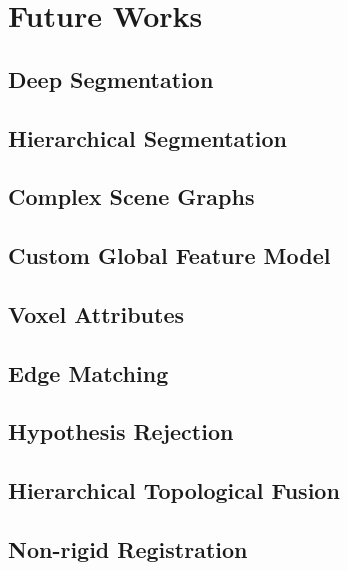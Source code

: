 \section{Future Works}

\subsection{Deep Segmentation}
\subsection{Hierarchical Segmentation}
\subsection{Complex Scene Graphs}

\subsection{Custom Global Feature Model}
\subsection{Voxel Attributes}
\subsection{Edge Matching}

\subsection{Hypothesis Rejection}
\subsection{Hierarchical Topological Fusion}
\subsection{Non-rigid Registration}